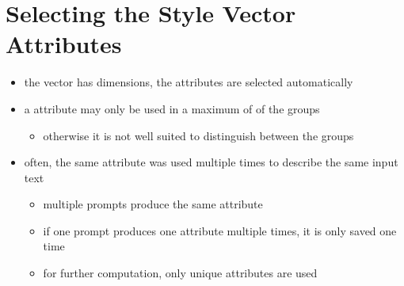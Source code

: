 

\section{Selecting the Style Vector Attributes}
\label{sec:approach:selection}

\begin{itemize}
  \item the vector has \styleVectorSize{} dimensions, the attributes are selected automatically
  \item a attribute may only be used in a maximum of \clusterMaxGroupRatio{} of the groups
        \begin{itemize}
          \item otherwise it is not well suited to distinguish between the groups
        \end{itemize}
  \item often, the same attribute was used multiple times to describe the same input text
        \begin{itemize}
          \item multiple prompts produce the same attribute
          \item if one prompt produces one attribute multiple times, it is only saved one time
          \item for further computation, only unique attributes are used
        \end{itemize}
\end{itemize}


